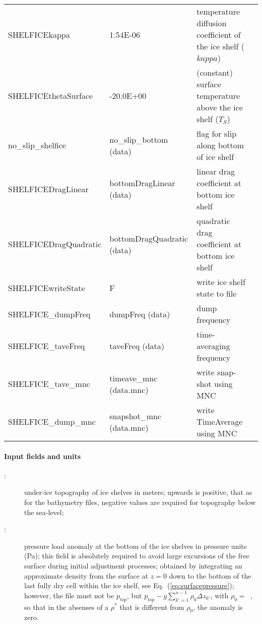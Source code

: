 \begin{table}[h!]
{\begin{tabular}{|lp{4cm}p{4cm}c|}
      SHELFICEkappa            &   1.54E-06
      &   temperature diffusion coefficient of the ice shelf ($kappa$)
      &  %
      \\
      SHELFICEthetaSurface     &  -20.0E+00
      &   (constant) surface temperature above the ice shelf ($T_{S}$)
      &  %
      \\
      no\_slip\_shelfice       & no\_slip\_bottom (data)
      &   flag for slip along bottom of ice shelf
      &  %
      \\
      SHELFICEDragLinear       & bottomDragLinear (data)
      &   linear drag coefficient at bottom ice shelf
      &  %
      \\
      SHELFICEDragQuadratic    & bottomDragQuadratic (data)
      &   quadratic drag coefficient at bottom ice shelf
      &  %
      \\
      SHELFICEwriteState       & F
      &   write ice shelf state to file 
      &  %
      \\
      SHELFICE\_dumpFreq       & dumpFreq (data)
      &   dump frequency
      &  %
      \\
      SHELFICE\_taveFreq       & taveFreq (data)
      &   time-averaging frequency 
      &  %
      \\
      SHELFICE\_tave\_mnc      & timeave\_mnc (data.mnc)
      &   write snap-shot   using MNC 
      &  %
      \\
      SHELFICE\_dump\_mnc      & snapshot\_mnc (data.mnc)
      &   write TimeAverage using MNC 
      &  %
      \\
\hline
\end{tabular}
}
\end{table}

\paragraph{Input fields and units\label{sec:pkg:shelfice:fields_units}}

\begin{description}
\item[:] under-ice topography of ice shelves in
  meters; upwards is positive, that as for the bathymetry files,
  negative values are required for topography below the sea-level;
\item[:] pressure load anomaly at the bottom of
  the ice shelves in pressure units (Pa); this field is absolutely
  required to avoid large excursions of the free surface during
  initial adjustment processes; obtained by integrating an approximate
  density from the surface at $z=0$ down to the bottom of the last
  fully dry cell within the ice shelf, see 
  Eq.~(\ref{eq:surfacepressure}); however, the file
   must not be $p_{top}$, but
  $p_{top}-g\sum_{k'=1}^{n-1}\rho_{0}\Delta{z}_{k'}$, with
  $\rho_{0}=$~, so that in the absenses of a $\rho^{*}$
  that is different from $\rho_{0}$, the anomaly is zero.
\end{description}

